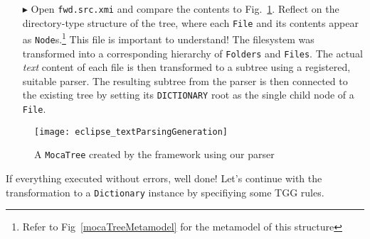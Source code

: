 \begin{itemize}

\item[$\blacktriangleright$] Open \texttt{fwd.src.xmi} and compare the contents to Fig.~\ref{eclipse:treeResult}. Reflect on the directory-type structure of the
tree, where each \texttt{File} and its contents appear as \texttt{Node}s.\footnote{Refer to Fig~\ref{mocaTreeMetamodel} for the metamodel of this structure}
This file is important to understand!
The filesystem was transformed into a corresponding hierarchy of
\texttt{Folders} and \texttt{Files}. The actual \emph{text} content of each file is then transformed to a subtree using a registered, suitable parser. The resulting subtree from the parser is then connected to the existing tree by setting its \texttt{DICTIONARY} root as the single child node of a \texttt{File}.

\end{itemize}

\vspace{0.5cm}

\begin{figure}[!htbp]
\begin{center}
 \texttt{[image: eclipse\_textParsingGeneration]}
  \caption{A \texttt{MocaTree} created by the framework using our parser}
  \label{eclipse:treeResult}
\end{center}
\end{figure}

If everything executed without errors, well done! Let's continue with the transformation to a \texttt{Dictionary} instance by specifiying some
TGG rules.
